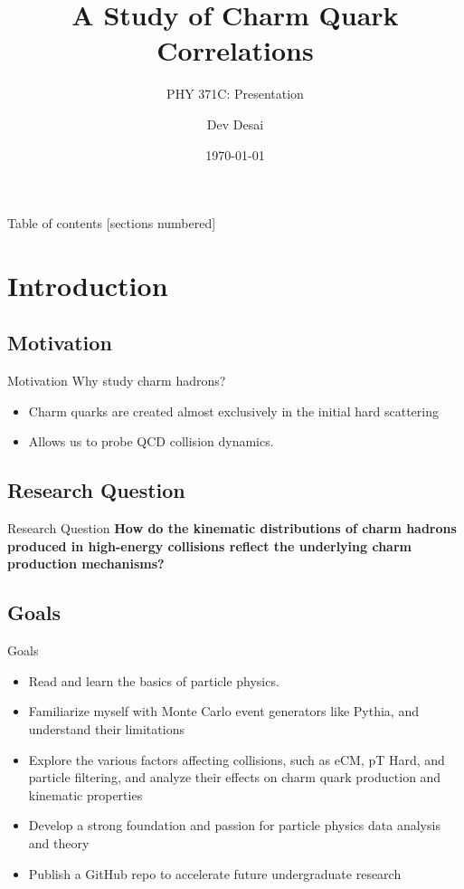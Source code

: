 \documentclass[10pt]{beamer}
\title{A Study of Charm Quark Correlations}
\subtitle{PHY 371C: Presentation}
\date{\today}
\date{}
\author{Dev Desai}
\begin{document}
\maketitle

\begin{frame}{Table of contents}
  [sections numbered]
  \tableofcontents[hideallsubsections]
\end{frame}

\section[Introduction]{Introduction}

\subsection{Motivation}

\begin{frame}[fragile]{Motivation}
Why study charm hadrons?

    \begin{itemize}
        \item Charm quarks are created almost exclusively in the initial hard scattering 
        \item Allows us to probe QCD collision dynamics.
    \end{itemize}
\end{frame}

\subsection{Research Question}

\begin{frame}[fragile]{Research Question}
\textbf{How do the kinematic distributions of charm hadrons produced in high-energy collisions reflect the underlying charm production mechanisms?}
\end{frame}

\subsection{Goals}

\begin{frame}{Goals}
\begin{itemize}
    \item Read and learn the basics of particle physics.
    \item Familiarize myself with Monte Carlo event generators like Pythia, and understand their limitations
    \item Explore the various factors affecting collisions, such as eCM, pT Hard, and particle filtering, and analyze their effects on charm quark production and kinematic properties
    \item Develop a strong foundation and passion for particle physics data analysis and theory
    \item Publish a GitHub repo to accelerate future undergraduate research
\end{itemize}
\end{frame}
\end{document}
